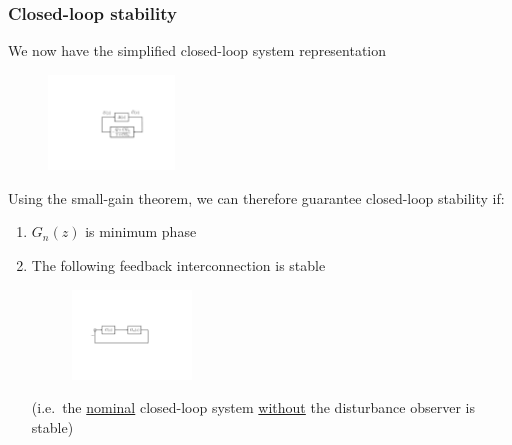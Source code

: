 \begin{frame}
    \frametitle{Closed-loop stability}

    We now have the simplified closed-loop system representation
    \begin{figure}
        \includegraphics[width=0.3\textwidth]{Disturbance_Observer_multi5}
    \end{figure}
    \pause
    Using the small-gain theorem, we can therefore guarantee closed-loop stability if:
    \begin{enumerate}
    \item
    $G_n(z)$ is minimum phase
    \pause

    \item
    The following feedback interconnection is stable
    \begin{figure}
        \includegraphics[width=0.3\textwidth]{Disturbance_Observer_multi6}
    \end{figure}
    \pause
    (i.e.\ the \underline{nominal} closed-loop system \underline{without} the disturbance observer is stable)
    \end{enumerate}

\end{frame}

